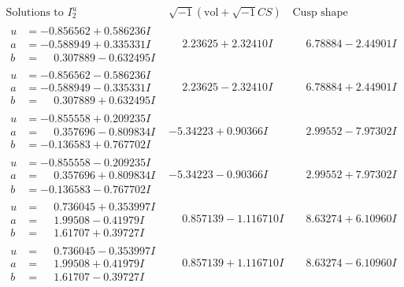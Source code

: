 \documentclass[1p]{elsarticle_modified}
\theoremstyle{definition}
\newcommand{\I}{\sqrt{-1}}
\begin{document}
$$\begin{array}{c|c|c}  
\text{Solutions to }I^u_{2}& \I (\text{vol} + \sqrt{-1}CS) & \text{Cusp shape}\\
 \hline 
\begin{aligned}
u &= -0.856562 + 0.586236 I \\
a &= -0.588949 + 0.335331 I \\
b &= \phantom{-}0.307889 - 0.632495 I\end{aligned}
 & \phantom{-}2.23625 + 2.32410 I & \phantom{-}6.78884 - 2.44901 I \\ \hline\begin{aligned}
u &= -0.856562 - 0.586236 I \\
a &= -0.588949 - 0.335331 I \\
b &= \phantom{-}0.307889 + 0.632495 I\end{aligned}
 & \phantom{-}2.23625 - 2.32410 I & \phantom{-}6.78884 + 2.44901 I \\ \hline\begin{aligned}
u &= -0.855558 + 0.209235 I \\
a &= \phantom{-}0.357696 - 0.809834 I \\
b &= -0.136583 + 0.767702 I\end{aligned}
 & -5.34223 + 0.90366 I & \phantom{-}2.99552 - 7.97302 I \\ \hline\begin{aligned}
u &= -0.855558 - 0.209235 I \\
a &= \phantom{-}0.357696 + 0.809834 I \\
b &= -0.136583 - 0.767702 I\end{aligned}
 & -5.34223 - 0.90366 I & \phantom{-}2.99552 + 7.97302 I \\ \hline\begin{aligned}
u &= \phantom{-}0.736045 + 0.353997 I \\
a &= \phantom{-}1.99508 - 0.41979 I \\
b &= \phantom{-}1.61707 + 0.39727 I\end{aligned}
 & \phantom{-}0.857139 - 1.116710 I & \phantom{-}8.63274 + 6.10960 I \\ \hline\begin{aligned}
u &= \phantom{-}0.736045 - 0.353997 I \\
a &= \phantom{-}1.99508 + 0.41979 I \\
b &= \phantom{-}1.61707 - 0.39727 I\end{aligned}
 & \phantom{-}0.857139 + 1.116710 I & \phantom{-}8.63274 - 6.10960 I \\ \hline\begin{aligned}

\end{aligned}
\end{array}$$
\end{document}

